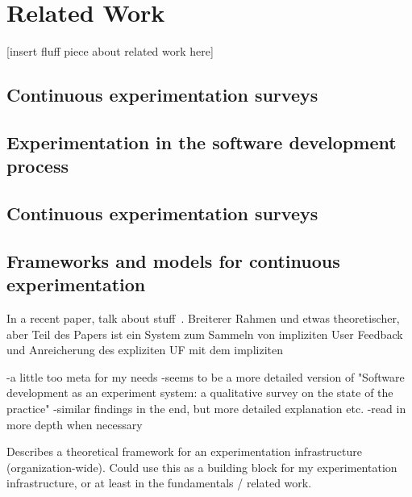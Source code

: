 %
\chapter{Related Work}
\label{ch:related-work}

[insert fluff piece about related work here]

\section{Continuous experimentation surveys}
\label{sec:related:surveys}

\cite{lindgren2015software}

\cite{Bosch2012}

\cite{Gutbrod2017}

\section{Experimentation in the software development process}
\label{sec:related:experimentation}

\cite{Olsson2012}

\section{Continuous experimentation surveys}
\label{sec:related:surveys}

\cite{lindgren2015software}

\cite{Bosch2012}

\cite{Gutbrod2017}

\section{Frameworks and models for continuous experimentation}
\label{sec:related:frameworks}

In a recent paper, \citeauthor{Johanssen2017} talk about stuff~\citet{Johanssen2017}.
Breiterer Rahmen und etwas theoretischer, aber Teil des Papers ist ein System zum Sammeln von impliziten User Feedback und Anreicherung des expliziten UF mit dem impliziten

\cite{Lindgren2015}
-a little too meta for my needs
-seems to be a more detailed version of "Software development as an experiment system: a qualitative survey on the state of the practice"
-similar findings in the end, but more detailed explanation etc.
-read in more depth when necessary

\cite{Fagerholm2014} Describes a theoretical framework for an experimentation infrastructure (organization-wide).
Could use this as a building block for my experimentation infrastructure, or at least in the fundamentals / related work.

